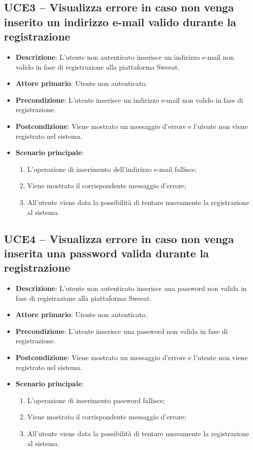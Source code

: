 \subsection{UCE3 – Visualizza errore in caso non venga inserito un indirizzo e-mail valido durante la registrazione}
\begin{itemize}
\item \textbf{Descrizione}: L'utente non autenticato inserisce un indirizzo e-mail non valido in fase di registrazione alla piattaforma Sweeat.
\item \textbf{Attore primario}: Utente non autenticato.
\item \textbf{Precondizione}: L'utente inserisce un indirizzo e-mail non valido in fase di registrazione.
\item \textbf{Postcondizione}: Viene mostrato un messaggio d'errore e l'utente non viene registrato nel sistema.

\item \textbf{Scenario principale}:
\begin{enumerate}
\item L'operazione di inserimento dell'indirizzo e-mail fallisce;
\item Viene mostrato il corrispondente messaggio d'errore;
\item All'utente viene data la possibilità di tentare nuovamente la registrazione al sistema.
\end{enumerate}
\end{itemize}

\subsection{UCE4 – Visualizza errore in caso non venga inserita una password valida durante la registrazione}
\begin{itemize}
\item \textbf{Descrizione}: L'utente non autenticato inserisce una password non valida in fase di registrazione alla piattaforma Sweeat.
\item \textbf{Attore primario}: Utente non autenticato.
\item \textbf{Precondizione}: L'utente inserisce una password non valida in fase di registrazione.
\item \textbf{Postcondizione}: Viene mostrato un messaggio d'errore e l'utente non viene registrato nel sistema.

\item \textbf{Scenario principale}:
\begin{enumerate}
\item L'operazione di inserimento password fallisce;
\item Viene mostrato il corrispondente messaggio d'errore;
\item All'utente viene data la possibilità di tentare nuovamente la registrazione al sistema.
\end{enumerate}
\end{itemize}